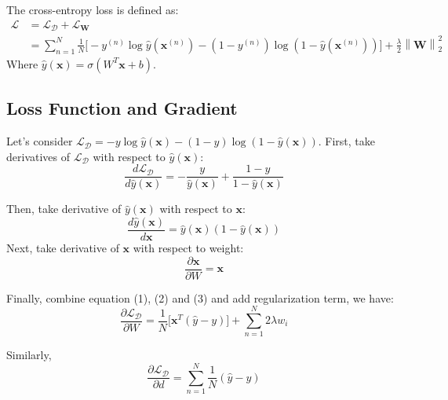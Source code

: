 \documentclass[10pt,letterpaper]{article}
\begin{document}
The cross-entropy loss is defined as: 
\begin{align*}
    \mathcal{L} &= \mathcal{L}_{\mathcal{D}} + \mathcal{L}_{\textbf{W}} \\
    &= \sum_{n=1}^{N}\frac{1}{N}\bigg[ -y^{(n)}\log\hat{y}(\textbf{x}^{(n)}) -(1-y^{(n)})\log(1-\hat{y}(\textbf{x}^{(n)}))\bigg] + \frac{\lambda}{2} \left\| \textbf{W} \right\|^{2}_{2}
\end{align*}
Where $\hat{y}(\textbf{x}) = \sigma(W^{T}\textbf{x}+b)$. 

\subsection{Loss Function and Gradient}
 Let's consider $\mathcal{L}_{\mathcal{D}} =  -y\log\hat{y}(\textbf{x}) -(1-y)\log(1-\hat{y}(\textbf{x}))$. First, take derivatives of $\mathcal{L}_{\mathcal{D}}$ with respect to $\hat{y}(\textbf{x})$:
\setcounter{equation}{0}
\begin{equation}
    \frac{d \mathcal{L}_{\mathcal{D}}}{d \hat{y}(\textbf{x})} = -\frac{y}{\hat{y}(\textbf{x})} + \frac{1-y}{1-\hat{y}(\textbf{x})}
\end{equation}

\noindent Then, take derivative of $\hat{y}(\textbf{x})$ with respect to $\textbf{x}$:
\begin{equation}
    \frac{d\hat{y}(\textbf{x})}{d\textbf{x}} = \hat{y}(\textbf{x})(1-\hat{y}(\textbf{x}))
\end{equation}
\noindent Next, take derivative of $\textbf{x}$ with respect to weight:
\begin{equation}
    \frac{\partial \textbf{x}}{\partial W} = \textbf{x}
\end{equation}

\noindent Finally, combine equation (1), (2) and (3) and add regularization term, we have: 
\begin{equation}
    \frac{\partial \mathcal{L}_{\mathcal{D}}}{\partial W} = \frac{1}{N}\Big[\textbf{x}^{T}(\hat{y} - y) \Big] + \sum_{n=1}^{N} 2\lambda w_{i}
\end{equation}

\noindent Similarly, 
\begin{equation}
    \frac{\partial \mathcal{L}_{\mathcal{D}}}{\partial d} = \sum_{n=1}^{N}\frac{1}{N}(\hat{y} - y) 
\end{equation}



\end{document}
